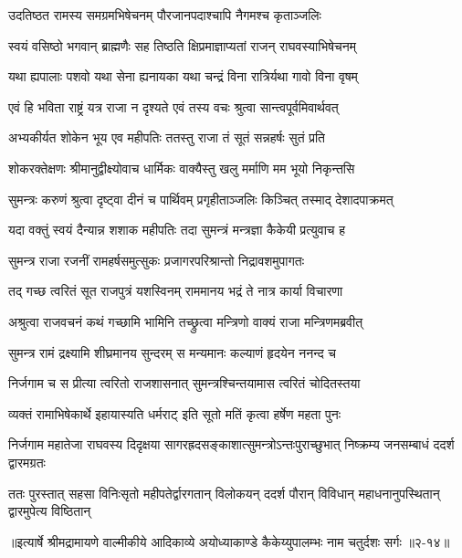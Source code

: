 \twolineshloka
{उदतिष्ठत रामस्य समग्रमभिषेचनम्}
{पौरजानपदाश्चापि नैगमश्च कृताञ्जलिः} %

\twolineshloka
{स्वयं वसिष्ठो भगवान् ब्राह्मणैः सह तिष्ठति}
{क्षिप्रमाज्ञाप्यतां राजन् राघवस्याभिषेचनम्} %

\twolineshloka
{यथा ह्यपालाः पशवो यथा सेना ह्यनायका}
{यथा चन्द्रं विना रात्रिर्यथा गावो विना वृषम्} %

\twolineshloka
{एवं हि भविता राष्ट्रं यत्र राजा न दृश्यते}
{एवं तस्य वचः श्रुत्वा सान्त्वपूर्वमिवार्थवत्} %

\twolineshloka
{अभ्यकीर्यत शोकेन भूय एव महीपतिः}
{ततस्तु राजा तं सूतं सन्नहर्षः सुतं प्रति} %

\twolineshloka
{शोकरक्तेक्षणः श्रीमानुद्वीक्ष्योवाच धार्मिकः}
{वाक्यैस्तु खलु मर्माणि मम भूयो निकृन्तसि} %

\twolineshloka
{सुमन्त्रः करुणं श्रुत्वा दृष्ट्वा दीनं च पार्थिवम्}
{प्रगृहीताञ्जलिः किञ्चित् तस्माद् देशादपाक्रमत्} %

\twolineshloka
{यदा वक्तुं स्वयं दैन्यान्न शशाक महीपतिः}
{तदा सुमन्त्रं मन्त्रज्ञा कैकेयी प्रत्युवाच ह} %

\twolineshloka
{सुमन्त्र राजा रजनीं रामहर्षसमुत्सुकः}
{प्रजागरपरिश्रान्तो निद्रावशमुपागतः} %

\twolineshloka
{तद् गच्छ त्वरितं सूत राजपुत्रं यशस्विनम्}
{राममानय भद्रं ते नात्र कार्या विचारणा} %

\twolineshloka
{अश्रुत्वा राजवचनं कथं गच्छामि भामिनि}
{तच्छ्रुत्वा मन्त्रिणो वाक्यं राजा मन्त्रिणमब्रवीत्} %

\twolineshloka
{सुमन्त्र रामं द्रक्ष्यामि शीघ्रमानय सुन्दरम्}
{स मन्यमानः कल्याणं हृदयेन ननन्द च} %

\twolineshloka
{निर्जगाम च स प्रीत्या त्वरितो राजशासनात्}
{सुमन्त्रश्चिन्तयामास त्वरितं चोदितस्तया} %

\twolineshloka
{व्यक्तं रामाभिषेकार्थे इहायास्यति धर्मराट्}
{इति सूतो मतिं कृत्वा हर्षेण महता पुनः} %

\threelineshloka
{निर्जगाम महातेजा राघवस्य दिदृक्षया}
{सागरह्रदसङ्काशात्सुमन्त्रोऽन्तःपुराच्छुभात्}
{निष्क्रम्य जनसम्बाधं ददर्श द्वारमग्रतः} %

\twolineshloka
{ततः पुरस्तात् सहसा विनिःसृतो महीपतेर्द्वारगतान् विलोकयन्}
{ददर्श पौरान् विविधान् महाधनानुपस्थितान् द्वारमुपेत्य विष्ठितान्} %


॥इत्यार्षे श्रीमद्रामायणे वाल्मीकीये आदिकाव्ये अयोध्याकाण्डे कैकेय्युपालम्भः नाम चतुर्दशः सर्गः ॥२-१४॥
